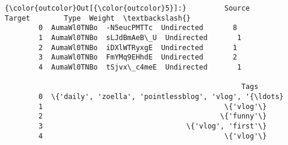 \documentclass[11pt]{article}
\begin{document}
\begin{Verbatim}[commandchars=\\\{\}]
{\color{outcolor}Out[{\color{outcolor}5}]:}         Source       Target        Type  Weight  \textbackslash{}
        0  AumaWl0TNBo  -N5eucPMTTc  Undirected       8   
        1  AumaWl0TNBo  sLJdBmAeB\_U  Undirected       1   
        2  AumaWl0TNBo  iDXlWTRyxgE  Undirected       1   
        3  AumaWl0TNBo  FmYMq9EHhdE  Undirected       2   
        4  AumaWl0TNBo  tSjvx\_c4meE  Undirected       1   
        
                                                        Tags  
        0  \{'daily', 'zoella', 'pointlessblog', 'vlog', '{\ldots}  
        1                                           \{'vlog'\}  
        2                                          \{'funny'\}  
        3                                  \{'vlog', 'first'\}  
        4                                           \{'vlog'\}  
\end{Verbatim}
            
\end{document}
